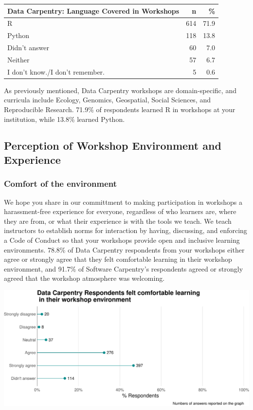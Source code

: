 \documentclass[]{article}
\makeatletter
\def\maxwidth{\ifdim\Gin@nat@width>\linewidth\linewidth\else\Gin@nat@width\fi}
\makeatother
\begin{document}
\begin{longtable}[]{@{}lrr@{}}
\toprule
Data Carpentry: Language Covered in Workshops & n & \%\tabularnewline
\midrule
\endhead
R & 614 & 71.9\tabularnewline
Python & 118 & 13.8\tabularnewline
Didn't answer & 60 & 7.0\tabularnewline
Neither & 57 & 6.7\tabularnewline
I don't know./I don't remember. & 5 & 0.6\tabularnewline
\bottomrule
\end{longtable}

As previously mentioned, Data Carpentry workshops are domain-specific,
and curricula include Ecology, Genomics, Geospatial, Social Sciences,
and Reproducible Research. 71.9\% of respondents learned R in workshops
at your institution, while 13.8\% learned Python.

\subsection{Perception of Workshop Environment and
Experience}\label{perception-of-workshop-environment-and-experience}

\subsubsection{Comfort of the
environment}\label{comfort-of-the-environment}

We hope you share in our committment to making participation in
workshops a harassment-free experience for everyone, regardless of who
learners are, where they are from, or what their experience is with the
tools we teach. We teach instructors to establish norms for interaction
by having, discussing, and enforcing a Code of Conduct so that your
workshops provide open and inclusive learning environments. 78.8\% of
Data Carpentry respondents from your workshops either agree or strongly
agree that they felt comfortable learning in their workshop environment,
and 91.7\% of Software Carpentry's respondents agreed or strongly agreed
that the workshop atmosphere was welcoming.

\includegraphics[width=\maxwidth]{../figures/dc-post-workshop-comfortable-environment-1}
\end{document}
